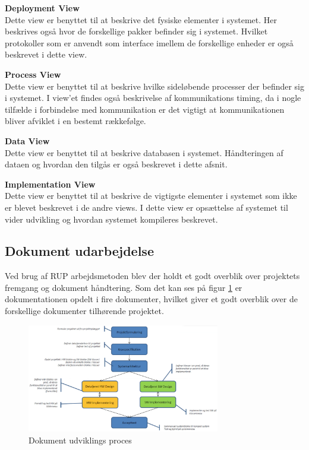 \textbf{Deployment View}\\
Dette view er benyttet til at beskrive det fysiske elementer i systemet. Her beskrives også hvor de forskellige pakker befinder sig i systemet. Hvilket protokoller som er anvendt som interface imellem de forskellige enheder er også beskrevet i dette view.

\textbf{Process View}\\
Dette view er benyttet til at beskrive hvilke sideløbende processer der befinder sig i systemet. I view'et findes også beskrivelse af kommunikations timing, da i nogle tilfælde i forbindelse med kommunikation er det vigtigt at kommunikationen bliver afviklet i en bestemt rækkefølge.

\textbf{Data View}\\
Dette view er benyttet til at beskrive databasen i systemet. Håndteringen af dataen og hvordan den tilgås er også beskrevet i dette afsnit. 

\textbf{Implementation View}\\
Dette view er benyttet til at beskrive de vigtigste elementer i systemet som ikke er blevet beskrevet i de andre views. I dette view er opsættelse af systemet til vider udvikling og hvordan systemet kompileres beskrevet.

\subsection{Dokument udarbejdelse}
Ved brug af RUP arbejdsmetoden blev der holdt et godt overblik over projektets fremgang og dokument håndtering. Som det kan ses på figur \ref{fig:dokument_udvikling} er dokumentationen opdelt i fire dokumenter, hvilket giver et godt overblik over de forskellige dokumenter tilhørende projektet. 

\begin{figure}[H]
	\centering
	\includegraphics[width=0.75\textwidth]{Billeder/Udviklingsproces/Dokument_udvikling}
	\caption{Dokument udviklings proces}
	\label{fig:dokument_udvikling}
\end{figure}